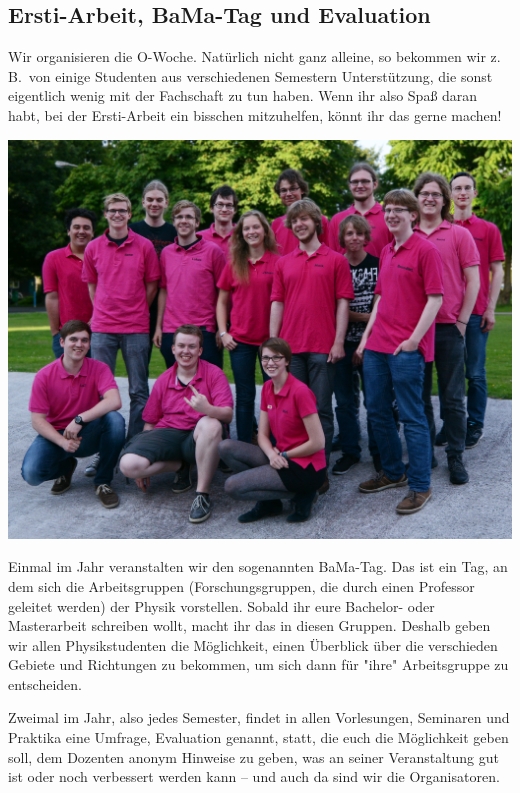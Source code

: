 \begin{multicols}{2}
\subsection*{Ersti-Arbeit, BaMa-Tag und Evaluation}
Wir organisieren die O-Woche.
Natürlich nicht ganz alleine, so bekommen wir z.\,B.\ von einige Studenten aus verschiedenen Semestern Unterstützung, die sonst eigentlich wenig mit der Fachschaft zu tun haben.
Wenn ihr also Spaß daran habt, bei der Ersti-Arbeit ein bisschen mitzuhelfen, könnt ihr das gerne machen!

\includegraphics[width=\columnwidth]{res/fsphys_gruppenfoto_2016_cropped.jpg}

Einmal im Jahr veranstalten wir den sogenannten BaMa-Tag.
Das ist ein Tag, an dem sich die Arbeitsgruppen (Forschungsgruppen, die durch einen Professor geleitet werden) der Physik vorstellen.
Sobald ihr eure Bachelor- oder Masterarbeit schreiben wollt, macht ihr das in diesen Gruppen.
Deshalb geben wir allen Physikstudenten die Möglichkeit, einen Überblick über die verschieden Gebiete und Richtungen zu bekommen, um sich dann für "ihre" Arbeitsgruppe zu entscheiden.

Zweimal im Jahr, also jedes Semester, findet in allen Vorlesungen, Seminaren und Praktika eine Umfrage, Evaluation genannt, statt, die euch die Möglichkeit geben soll, dem Dozenten anonym Hinweise zu geben, was an seiner Veranstaltung gut ist oder noch verbessert werden kann -- und auch da sind wir die Organisatoren.


\end{multicols}
